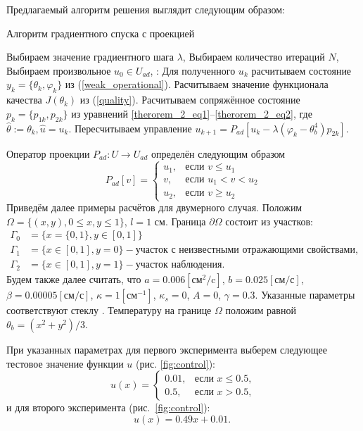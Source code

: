 Предлагаемый алгоритм решения выглядит следующим образом:
\begin{algorithm}[H]
    \caption{Алгоритм градиентного спуска с проекцией}
    \begin{algorithmic}[1]
        \State Выбираем значение градиентного шага $\lambda$,
        \State Выбираем количество итераций $N$,
        \State Выбираем произвольное $u_0 \in U_{ad}$,
            :
            \State Для полученного $u_k$ расчитываем состояние $y_k = \{\theta_k, \varphi_k\}$ из  (\ref{weak_operational}).
            \State Расчитываем значение функционала качества $J(\theta_k)$ из (\ref{quality}).
            \State Расчитываем сопряжённое состояние $p_k=\{p_{1k},p_{2k}\}$ из уравнений \eqref{therorem_2_eq1}--\eqref{therorem_2_eq2}, где $ \hat{\theta} := \theta_k, \hat{u}=u_k$.
            \State Пересчитываем управление $u_{k+1} = P_{ad}\left[ u_k - \lambda (\varphi_k - \theta_b^4)p_{2k} \right]$.
        \EndFor
    \end{algorithmic}\label{alg:algorithm}
\end{algorithm}
Оператор проекции $P_{ad} : U \to U_{ad}$ определён следующим образом
\[
    P_{ad}[v] =
    \begin{cases}
        u_1, & \text{если } v \le u_1 \\
        v, & \text{если } u_1 < v < u_2 \\
        u_2, & \text{если } v \ge u_2
    \end{cases}
\]
Приведём далее примеры расчётов для двумерного случая.
Положим $\Omega = \{(x,y), 0 \leq x,y \leq 1\}$, $l = 1$ см.
Граница $\partial\Omega$ состоит из участков:
\[
    \begin{aligned}
        \Gamma_0 & = \{x=\{0,1\}, y \in [0,1]\} \\
        \Gamma_1 & = \{x\in [0,1], y=0\} - \text{участок с неизвестными отражающими свойствами,} \\
        \Gamma_2 & = \{x \in [0,1], y=1\} - \text{участок наблюдения.}
    \end{aligned}
\]
Будем также далее считать, что $a = 0.006[\text{см}^2/\text{c}]$, $b=0.025[\text{см}/\text{с}]$,
$\beta = 0.00005[\text{см}/\text{с}]$, $\kappa=1[\text{см}^{-1}]$, $\kappa_s = 0$, $A = 0$, $\gamma = 0.3$.
Указанные параметры соответствуют стеклу \cite{grenkin_13}.
Температуру на границе $\Omega$ положим равной $\theta_b = (x^2+y^2)/3$.

При указанных параметрах для первого эксперимента выберем следующее тестовое значение
функции $u$ (рис. \ref{fig:control}):
\begin{equation}
    u(x)=
    \begin{cases}
        0.01, & \text{если } x \le 0.5, \\
        0.5, & \text{если } x > 0.5,
    \end{cases}\label{eq:equation}
\end{equation}
и для второго эксперимента (рис.~\ref{fig:control}):
\begin{equation}
    \label{eq:test_function_1}
    u(x)=0.49x+0.01. \;
\end{equation}

